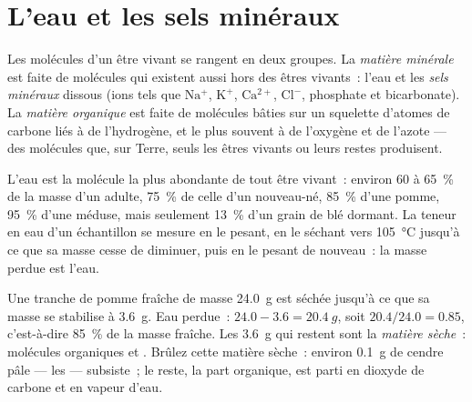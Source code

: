 \section{L'eau et les sels minéraux}

\begin{definition}\label{def:g10:chemistry-of-life:mineral-organic}
Les molécules d'un être vivant se rangent en deux groupes. La
\emph{matière minérale} est faite de molécules
qui existent aussi hors des êtres vivants~: l'eau et les
\emph{sels minéraux} dissous (ions tels que
$\mathrm{Na^+}$, $\mathrm{K^+}$, $\mathrm{Ca^{2+}}$, $\mathrm{Cl^-}$,
phosphate et bicarbonate). La \emph{matière organique}
est faite de molécules bâties sur un squelette d'atomes de carbone liés
à de l'hydrogène, et le plus souvent à de l'oxygène et de l'azote ---
des molécules que, sur Terre, seuls les êtres vivants ou leurs restes
produisent.
\end{definition}

\begin{proposition}\label{prop:g10:chemistry-of-life:water}
L'eau est la molécule la plus abondante de tout être vivant~: environ
60 à 65~\% de la masse d'un adulte, 75~\% de celle d'un nouveau-né,
85~\% d'une pomme, 95~\% d'une méduse, mais seulement 13~\% d'un grain
de blé dormant. La teneur en eau d'un échantillon se mesure en le
pesant, en le séchant vers \qty{105}{\celsius} jusqu'à ce que sa masse
cesse de diminuer, puis en le pesant de nouveau~: la masse perdue est
l'eau.
\end{proposition}
\admitted

\begin{example}\label{ex:g10:chemistry-of-life:apple}
Une tranche de pomme fraîche de masse \qty{24.0}{g} est séchée jusqu'à
ce que sa masse se stabilise à \qty{3.6}{g}. Eau perdue~:
$24.0 - 3.6 = \qty{20.4}{g}$, soit
$20.4/24.0 = 0.85$, c'est-à-dire 85~\% de la masse fraîche. Les
\qty{3.6}{g} qui restent sont la \emph{matière sèche}~: molécules
organiques et . Brûlez cette matière sèche~: environ
\qty{0.1}{g} de cendre pâle --- les  --- subsiste~; le
reste, la part organique, est parti en dioxyde de carbone et en vapeur
d'eau.
\end{example}

